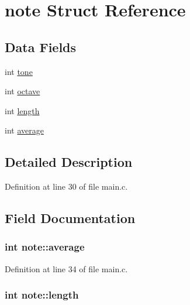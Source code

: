 \hypertarget{structnote}{\section{note Struct Reference}
\label{structnote}
}
\subsection*{Data Fields}
\begin{DoxyCompactItemize}
\item 
int \hyperlink{structnote_a30832d96c968d682e5838b39370a1908}{tone}
\item 
int \hyperlink{structnote_a8b58f133e02c3ea4ec40ee641b654dcf}{octave}
\item 
int \hyperlink{structnote_a348563a2eef21d1187cf04f493fedf36}{length}
\item 
int \hyperlink{structnote_aed9fb8ec9c20fa4620f928c988dba840}{average}
\end{DoxyCompactItemize}


\subsection{Detailed Description}


Definition at line 30 of file main.\+c.



\subsection{Field Documentation}
\hypertarget{structnote_aed9fb8ec9c20fa4620f928c988dba840}{
\subsubsection[{average}]{\setlength{\rightskip}{0pt plus 5cm}int note\+::average}}\label{structnote_aed9fb8ec9c20fa4620f928c988dba840}


Definition at line 34 of file main.\+c.

\hypertarget{structnote_a348563a2eef21d1187cf04f493fedf36}{
\subsubsection[{length}]{\setlength{\rightskip}{0pt plus 5cm}int note\+::length}}\label{structnote_a348563a2eef21d1187cf04f493fedf36}



